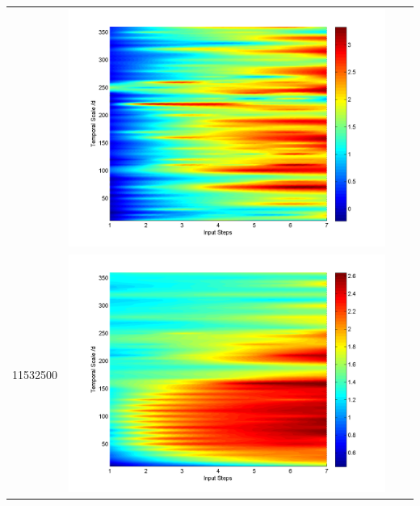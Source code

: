\documentclass[11pt]{article}
\begin{document}
\begin{table}[H]
{\begin{tabular}{c  c   c   c  }
&\begin{minipage}{.3\textwidth}\includegraphics[width=\linewidth]{resultgraph/11025500pepq.png}\end{minipage}
\\
11532500
&\begin{minipage}{.3\textwidth}\includegraphics[width=\linewidth]{resultgraph/11532500p.png}\end{minipage}

\end{tabular}}
\end{table}
\end{document}
